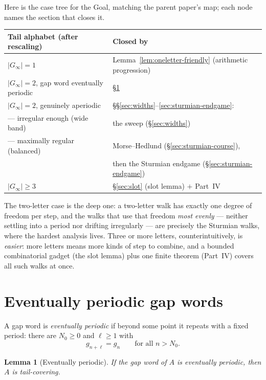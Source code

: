 \documentclass[11pt,reqno]{amsart}
\theoremstyle{plain}
\newtheorem{lemma}[theorem]{Lemma}
\theoremstyle{definition}
\theoremstyle{remark}
\newcommand{\Ginf}{G_\infty}
\begin{document}
Here is the case tree for the Goal, matching the parent paper's map; each node names
the section that closes it.

\begin{center}\small
\begin{tabular}{@{}ll@{}}
\toprule
Tail alphabet (after rescaling) & Closed by \\
\midrule
$|\Ginf| = 1$ & Lemma~\ref{lem:oneletter-friendly} (arithmetic progression) \\
$|\Ginf| = 2$, gap word eventually periodic & \S\ref{sec:periodic} \\
$|\Ginf| = 2$, genuinely aperiodic & \S\S\ref{sec:widths}--\ref{sec:sturmian-endgame}: \\
\quad --- irregular enough (wide band) & \quad the sweep (\S\ref{sec:widths}) \\
\quad --- maximally regular (balanced) & \quad Morse--Hedlund
  (\S\ref{sec:sturmian-course}), \\
  & \quad then the Sturmian endgame (\S\ref{sec:sturmian-endgame}) \\
$|\Ginf| \ge 3$ & \S\ref{sec:slot} (slot lemma) $+$ Part~IV \\
\bottomrule
\end{tabular}
\end{center}

The two-letter case is the deep one: a two-letter walk has exactly one degree of
freedom per step, and the walks that use that freedom \emph{most evenly} --- neither
settling into a period nor drifting irregularly --- are precisely the Sturmian walks,
where the hardest analysis lives. Three or more letters, counterintuitively, is
\emph{easier}: more letters means more kinds of step to combine, and a bounded
combinatorial gadget (the slot lemma) plus one finite theorem (Part~IV) covers all
such walks at once.


\section{Eventually periodic gap words}\label{sec:periodic}

A gap word is \emph{eventually periodic} if beyond some point it repeats with a
fixed period: there are $N_0 \ge 0$ and $\ell \ge 1$ with
\[
  g_{n + \ell} = g_n \qquad \text{for all } n > N_0 .
\]

\begin{lemma}[Eventually periodic]\label{lem:periodic-friendly}
If the gap word of $A$ is eventually periodic, then $A$ is tail-covering.
\end{lemma}
\end{document}
